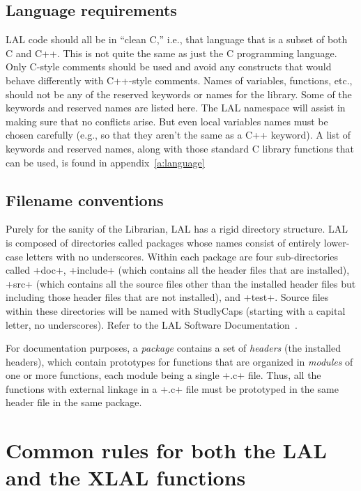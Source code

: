 \documentclass[10pt]{ligodcc}
\makeatletter
\def\verb{\relax\ifmmode\hbox\else\leavevmode\null\fi
  \bgroup
    \color{blue}\small
    \verb@eol@error \let\do\@makeother \dospecials
    \verbatim@font\@noligs
    \@ifstar\@sverb\@verb}
\makeatother
\begin{document}
\subsection{Language requirements}
LAL code should all be in ``clean C,'' i.e., that language that is a 
subset of both C and C++.  This is not quite the same as just the C 
programming language.  Only C-style comments should be used and avoid
any constructs that would behave differently with C++-style comments.
Names of variables, functions, etc., should not be any of the reserved
keywords or names for the library.  Some of the keywords and reserved
names are listed here.  The LAL namespace will assist in making sure
that no conflicts arise.  But even local variables names must be chosen
carefully (e.g., so that they aren't the same as a C++ keyword).
A list of keywords and reserved names, along with those standard C library
functions that can be used, is found in appendix~\ref{a:language}


\subsection{Filename conventions}

Purely for the sanity of the Librarian, LAL has a rigid directory structure.
LAL is composed of directories called packages whose names consist of entirely
lower-case letters with no underscores.  Within each package are four
sub-directories called \verb+doc+, \verb+include+ (which contains all the
header files that are installed), \verb+src+ (which contains all the source
files other than the installed header files but including those header files
that are not installed), and \verb+test+.  Source files within these
directories will be named with StudlyCaps (starting with a capital letter, no
underscores).  Refer to the LAL Software Documentation~\cite{lsd}.

For documentation purposes, a \emph{package} contains a set of \emph{headers}
(the installed headers), which contain prototypes for functions that are
organized in \emph{modules} of one or more functions, each module being a
single \verb+.c+ file.  Thus, all the functions with external linkage in a
\verb+.c+ file must be prototyped in the same header file in the same package.


\section{Common rules for both the LAL and the XLAL functions}
\end{document}
